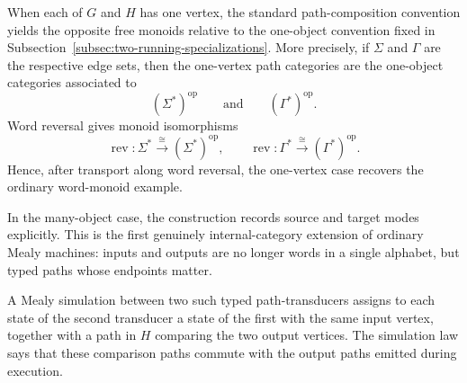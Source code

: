 \begin{example}
    When each of \(G\) and \(H\) has one vertex, the standard path-composition
    convention yields the opposite free monoids relative to the one-object
    convention fixed in
    Subsection~\ref{subsec:two-running-specializations}. More precisely, if
    \(\Sigma\) and \(\Gamma\) are the respective edge sets, then the one-vertex
    path categories are the one-object categories associated to
    \[
        (\Sigma^\ast)^{\mathrm{op}}
        \qquad\text{and}\qquad
        (\Gamma^\ast)^{\mathrm{op}}.
    \]
    Word reversal gives monoid isomorphisms
    \[
        \operatorname{rev}:
        \Sigma^\ast\overset{\cong}{\longrightarrow}
        (\Sigma^\ast)^{\mathrm{op}},
        \qquad
        \operatorname{rev}:
        \Gamma^\ast\overset{\cong}{\longrightarrow}
        (\Gamma^\ast)^{\mathrm{op}}.
    \]
    Hence, after transport along word reversal, the one-vertex case recovers
    the ordinary word-monoid example.
    
    In the many-object case, the construction records source and target modes
    explicitly. This is the first genuinely internal-category extension of
    ordinary Mealy machines: inputs and outputs are no longer words in a single
    alphabet, but typed paths whose endpoints matter.
    
    A Mealy simulation between two such typed path-transducers assigns to each
    state of the second transducer a state of the first with the same input
    vertex, together with a path in \(H\) comparing the two output vertices.
    The simulation law says that these comparison paths commute with the output
    paths emitted during execution.
\end{example}

